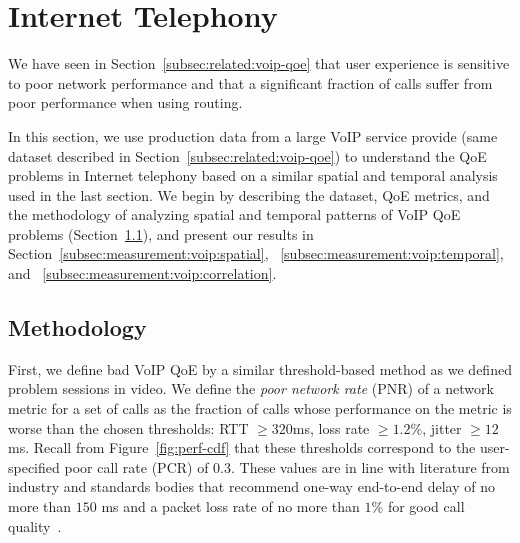 \section{Internet Telephony}
\label{sec:measurement:voip}

We have seen in 
Section~\ref{subsec:related:voip-qoe} that user 
experience is sensitive to poor network performance 
and that a significant fraction of calls suffer from poor 
performance when using \direct routing. 

In this section, we use production data from a large VoIP service 
provide \skype (same dataset described in
 Section~\ref{subsec:related:voip-qoe}) 
to understand the QoE problems in Internet telephony
based on a similar spatial and temporal analysis used in the last section.
We begin by describing the dataset, QoE metrics, and the methodology
of analyzing spatial and temporal patterns
of VoIP QoE problems (Section~\ref{subsec:measurement:voip:method}),
and present our results in 
Section~\ref{subsec:measurement:voip:spatial}, 
~\ref{subsec:measurement:voip:temporal}, and
~\ref{subsec:measurement:voip:correlation}.



\subsection{Methodology}
\label{subsec:measurement:voip:method}

First, we define bad VoIP QoE by a similar threshold-based method
as we defined problem sessions in video.
We define the {\em poor network rate} (PNR) of a network 
metric for a set of calls as the fraction of calls whose performance 
on the metric is worse than the chosen thresholds: 
RTT $\geq 320$ms, loss rate $\geq 1.2\%$, jitter $\geq 12$ms. 
Recall from Figure~\ref{fig:perf-cdf} that these thresholds 
correspond to the user-specified poor call rate (PCR) of $0.3$.
These values are in line with literature from industry 
and standards bodies that recommend one-way end-to-end 
delay of no more than $150$ ms and a packet loss rate of 
no more than $1\%$ for good call quality~\cite{cisco-voip, itu}. 


